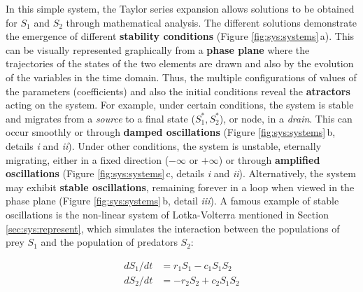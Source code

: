 \documentclass[./main_en.tex]{subfiles}
\begin{document}
In this simple \gls{system}, the Taylor series expansion allows solutions to be obtained for $S_1$ and $S_2$ through mathematical analysis. The different solutions demonstrate the emergence of different \textbf{stability conditions} (Figure \ref{fig:sys:systems}\,a). This can be visually represented graphically from a \textbf{phase plane} where the trajectories of the states of the two elements are drawn and also by the evolution of the variables in the time domain. Thus, the multiple configurations of values of the \gls{parameters} (coefficients) and also the initial conditions reveal the \textbf{\gls{atractors}} acting on the \gls{system}. For example, under certain conditions, the \gls{system} is stable and migrates from a \textit{source} to a final state ($S^*_1, S^*_2$), or node, in a \textit{drain}. This can occur smoothly or through \textbf{damped oscillations} (Figure \ref{fig:sys:systems}\,b, details \textrm{\textit{i}} and \textrm{\textit{ii}}). Under other conditions, the \gls{system} is unstable, eternally migrating, either in a fixed direction ($-\infty$ or $+\infty$) or through \textbf{amplified oscillations} (Figure \ref{fig:sys:systems}\,c, details \textrm{\textit{i}} and \textrm{\textit{ii}}). Alternatively, the \gls{system} may exhibit \textbf{stable oscillations}, remaining forever in a loop when viewed in the phase plane (Figure \ref{fig:sys:systems}\,b, detail \textrm{\textit{iii}}). A famous example of stable oscillations is the non-linear \gls{system} of Lotka-Volterra mentioned in Section \ref{sec:sys:represent}, which simulates the interaction between the populations of prey $S_1$ and the population of predators $S_2$:
\begin{linenomath*}
\[
\begin{split}
    dS_1/dt &= r_{1}S_1 - c_{1}S_1S_2\\
    dS_2/dt &= -r_{2}S_2 + c_{2}S_1S_2\\
\end{split}
\]
\end{linenomath*}
\end{document}
